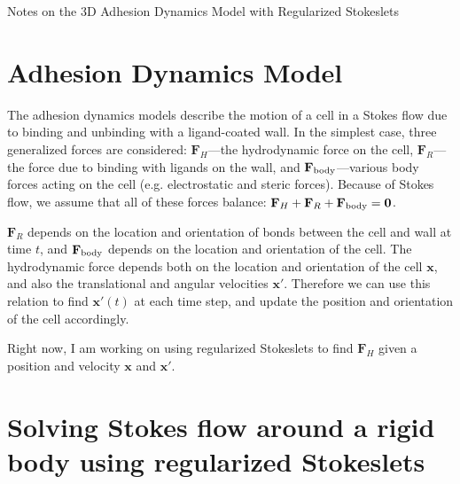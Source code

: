 \documentclass{article}
\newcommand{\tn}{\textnormal}
\newcommand{\F}{\mathbf{F}}
\begin{document}
\pagestyle{plain}

\begin{center}
  {\Large Notes on the 3D Adhesion Dynamics Model with Regularized
    Stokeslets}
\end{center}

\section{Adhesion Dynamics Model}
\label{sec:adhes-dynam-model}

The adhesion dynamics models describe the motion of a cell in a Stokes
flow due to binding and unbinding with a ligand-coated wall. In
the simplest case, three generalized forces are considered:
$\F_H$---the hydrodynamic force on the cell, $\F_R$---the force due to
binding with ligands on the wall, and $\F_\tn{body}$---various
body forces acting on the cell (e.g. electrostatic and steric
forces). Because of Stokes flow, we assume that all of these forces
balance: $\F_H + \F_R + \F_\tn{body} = \boldsymbol{0}$.

$\F_R$ depends on the location and orientation of bonds between the
cell and wall at time $t$, and $\F_\tn{body}$ depends on the location
and orientation of the cell. The hydrodynamic force depends both on
the location and orientation of the cell $\mathbf{x}$, and also the
translational and angular velocities $\mathbf{x}'$. Therefore we can
use this relation to find $\mathbf{x}'(t)$ at each time step, and
update the position and orientation of the cell accordingly.

Right now, I am working on using regularized Stokeslets to find $\F_H$
given a position and velocity $\mathbf{x}$ and $\mathbf{x}'$.

\section{Solving Stokes flow around a rigid body using regularized
  Stokeslets}
\label{sec:solving-stokes-flow}
\end{document}
